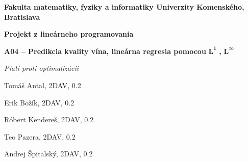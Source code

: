 \documentclass[12pt,oneside,a4paper,slovak]{article}
\begin{document}
	\setcounter{section}{-1}
	\begin{titlepage}
		\large
		
		\begin{center}
			\textbf{Fakulta matematiky, fyziky a informatiky Univerzity Komenského, Bratislava}
			
			\vspace{8cm}
			
			\LARGE\textbf{Projekt z lineárneho programovania}
			
			\LARGE\textbf{A04 – Predikcia kvality vína, lineárna regresia pomocou} $\mathbf{L^1}$ \textbf{,} $\mathbf{L^{\infty}}$
			
			\bigskip 
		\end{center}
			
		\vfill
		
		\hfill
		\begin{minipage}{0.5\textwidth}
			\raggedleft
			
			\textit{Piati proti optimalizácii}
	
			Tomáš Antal, 2DAV, 0.2
			
			Erik Božík, 2DAV, 0.2
			
			Róbert Kendereš, 2DAV, 0.2
			
			Teo Pazera, 2DAV, 0.2
			
			Andrej Špitalský, 2DAV, 0.2
		\end{minipage}
			
	\end{titlepage}
	
	\tableofcontents
	\newpage
	
	
	\newpage
	
	\newpage
	
	\newpage
	
	\newpage
	
	\newpage
	
	\newpage
	
	\newpage
	
	\newpage
	
	\newpage
	
	\newpage
	
\end{document}
